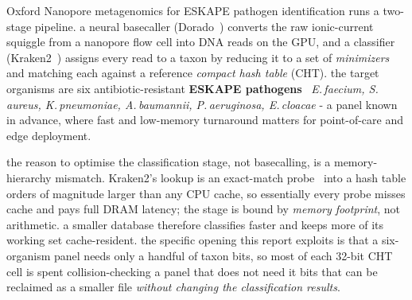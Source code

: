 \documentclass[10.5pt]{article}
\begin{document}
Oxford Nanopore metagenomics for ESKAPE pathogen identification runs a two-stage pipeline. a neural basecaller (Dorado~\cite{dorado})  converts the raw ionic-current squiggle from a nanopore flow cell into DNA reads on the GPU, and a classifier (Kraken2~\cite{kraken2}) assigns every read to a taxon by reducing it to a set of \textit{minimizers}~\cite{minimizers} and matching each against a reference \textit{compact hash table} (CHT). the target organisms are six antibiotic-resistant \textbf{ESKAPE pathogens}~\cite{eskape}  \textit{E.\,faecium, S.\,aureus, K.\,pneumoniae, A.\,baumannii, P.\,aeruginosa, E.\,cloacae} - a panel known in advance, where fast and low-memory turnaround matters for point-of-care and edge deployment.

the reason to optimise the classification stage, not basecalling, is a memory-hierarchy mismatch. Kraken2's lookup is an exact-match probe~\cite{kraken1} into a hash table orders of magnitude larger than any CPU cache, so essentially every probe misses cache and pays full DRAM latency; the stage is bound by \textit{memory footprint}, not arithmetic. a smaller database therefore classifies faster and keeps more of its working set cache-resident. the specific opening this report exploits is that a six-organism panel needs only a handful of taxon bits, so most of each 32-bit CHT cell is spent collision-checking a panel that does not need it bits that can be reclaimed as a smaller file \textit{without changing the classification results}.

\begin{center}
\end{center}
\end{document}

